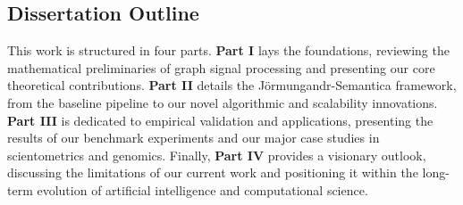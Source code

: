 \subsection{Dissertation Outline}
This work is structured in four parts. \textbf{Part I} lays the foundations, reviewing the mathematical preliminaries of graph signal processing and presenting our core theoretical contributions. \textbf{Part II} details the Jörmungandr-Semantica framework, from the baseline pipeline to our novel algorithmic and scalability innovations. \textbf{Part III} is dedicated to empirical validation and applications, presenting the results of our benchmark experiments and our major case studies in scientometrics and genomics. Finally, \textbf{Part IV} provides a visionary outlook, discussing the limitations of our current work and positioning it within the long-term evolution of artificial intelligence and computational science.